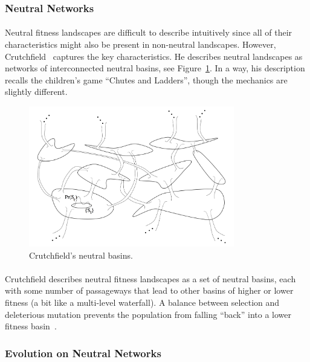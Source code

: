 \documentclass[12pt,letterpaper,titlepage]{article}
\begin{document}
\subsubsection{Neutral Networks}

\paragraph{}
Neutral fitness landscapes are difficult to describe intuitively since all of
their characteristics might also be present in non-neutral landscapes. However,
Crutchfield~\cite{Crutchfield1999} captures the key characteristics. He
describes neutral landscapes as networks of interconnected neutral basins,
see Figure~\ref{fig:crutchfield-basins}. In a way, his description recalls the children's
game ``Chutes and Ladders'', though the mechanics are slightly different.

\begin{figure}
    \centering
    \includegraphics[width=0.8\textwidth]{crutchfield-basins}
    \caption{Crutchfield's neutral basins.}
\label{fig:crutchfield-basins}
\end{figure}

\paragraph{}
Crutchfield describes neutral fitness landscapes as a set of neutral basins,
each with some number of passageways that lead to other basins of higher or
lower fitness (a bit like a multi-level waterfall). A balance between selection
and deleterious mutation prevents the population from falling ``back'' into a
lower fitness basin~\cite{Crutchfield1999}.

\subsubsection{Evolution on Neutral Networks}
\end{document}
